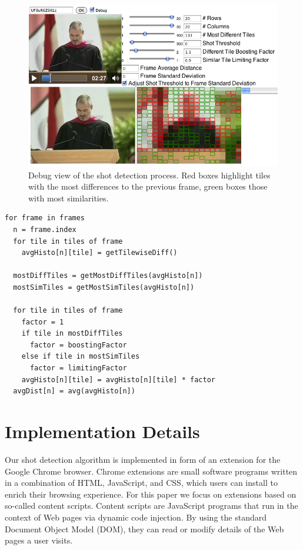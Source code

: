 \documentclass{acm_proc_article-sp}
\begin{document}
\begin{figure}
\begin{center}
   \includegraphics[width=0.9\linewidth]{./resources/algorithm.png}
\end{center}
   \caption{Debug view of the shot detection process. Red boxes highlight tiles with the most differences to the previous frame, green boxes those with most similarities.}
\label{fig:algorithm}
\end{figure}

\begin{lstlisting}[caption=Pseudocode of shot detection algorithm., label=code:algorithm, float]
for frame in frames
  n = frame.index  
  for tile in tiles of frame      
    avgHisto[n][tile] = getTilewiseDiff()
 
  mostDiffTiles = getMostDiffTiles(avgHisto[n])
  mostSimTiles = getMostSimTiles(avgHisto[n])
 
  for tile in tiles of frame    
    factor = 1  
    if tile in mostDiffTiles
      factor = boostingFactor
    else if tile in mostSimTiles
      factor = limitingFactor
    avgHisto[n][tile] = avgHisto[n][tile] * factor
  avgDist[n] = avg(avgHisto[n])
\end{lstlisting}

\section{Implementation Details} \label{sec:implementation}
Our shot detection algorithm is implemented in form of an extension for the Google Chrome browser. Chrome extensions are small software programs written in a combination of HTML, JavaScript, and CSS, which users can install to enrich their browsing experience. For this paper we focus on extensions based on so-called content scripts. Content scripts are JavaScript programs that run in the context of Web pages via dynamic code injection. By using the standard Document Object Model (DOM), they can read or modify details of the Web pages a user visits.
\end{document}
